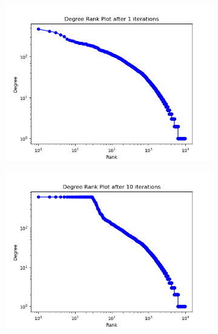 \documentclass[12pt]{article}
\numberwithin{equation}{section}
\begin{document}
\begin{figure}[!ht]
\centering

\begin{subfigure}[b]{0.32\textwidth}
    \includegraphics[width=\textwidth]{Prob S movie rank plot - 1 iterations.png}
\end{subfigure}
\hfill
\begin{subfigure}[b]{0.32\textwidth}
    \includegraphics[width=\textwidth]{Prob S movie rank plot - 10 iterations.png}
\end{subfigure}
\hfill
\begin{subfigure}[b]{0.32\textwidth}

\end{subfigure}
\end{figure}
\end{document}
